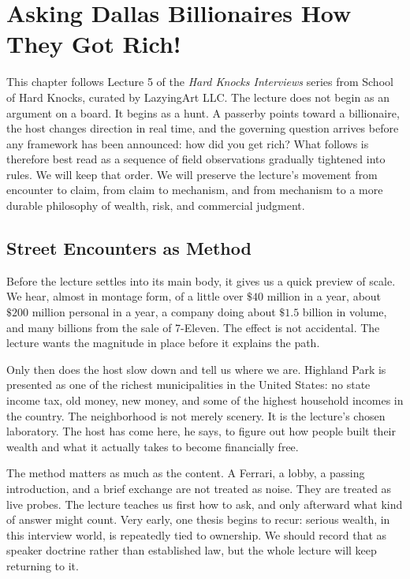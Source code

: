 \chapter{Asking Dallas Billionaires How They Got Rich!}

This chapter follows Lecture 5 of the \emph{Hard Knocks Interviews} series from School of Hard Knocks, curated by LazyingArt LLC. The lecture does not begin as an argument on a board. It begins as a hunt. A passerby points toward a billionaire, the host changes direction in real time, and the governing question arrives before any framework has been announced: how did you get rich? What follows is therefore best read as a sequence of field observations gradually tightened into rules. We will keep that order. We will preserve the lecture's movement from encounter to claim, from claim to mechanism, and from mechanism to a more durable philosophy of wealth, risk, and commercial judgment.

\section{Street Encounters as Method}

Before the lecture settles into its main body, it gives us a quick preview of scale. We hear, almost in montage form, of a little over \(\$40\) million in a year, about \(\$200\) million personal in a year, a company doing about \(\$1.5\) billion in volume, and many billions from the sale of 7-Eleven. The effect is not accidental. The lecture wants the magnitude in place before it explains the path.

Only then does the host slow down and tell us where we are. Highland Park is presented as one of the richest municipalities in the United States: no state income tax, old money, new money, and some of the highest household incomes in the country. The neighborhood is not merely scenery. It is the lecture's chosen laboratory. The host has come here, he says, to figure out how people built their wealth and what it actually takes to become financially free.

The method matters as much as the content. A Ferrari, a lobby, a passing introduction, and a brief exchange are not treated as noise. They are treated as live probes. The lecture teaches us first how to ask, and only afterward what kind of answer might count. Very early, one thesis begins to recur: serious wealth, in this interview world, is repeatedly tied to ownership. We should record that as speaker doctrine rather than established law, but the whole lecture will keep returning to it.

